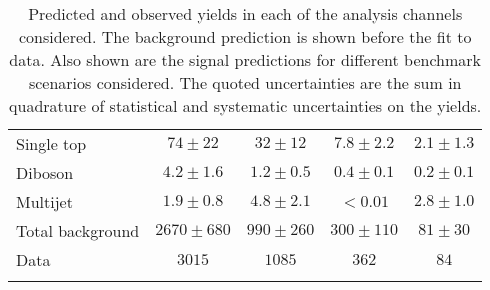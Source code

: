 \begin{table}
\begin{center}
{\begin{tabular}{l*{4}{c}}
Single top & $74 \pm 22$ & $32 \pm 12$ & $7.8 \pm 2.2$ & $2.1 \pm 1.3$\\
Diboson & $4.2 \pm 1.6$ & $1.2 \pm 0.5$ & $0.4 \pm 0.1$ & $0.2 \pm 0.1$\\
Multijet & $1.9 \pm 0.8$ & $4.8 \pm 2.1$ & $<0.01$ & $2.8 \pm 1.0$\\
\midrule
Total background & $2670 \pm 680$          & $990 \pm 260$          & $300 \pm 110$          & $81 \pm 30$         \\
\midrule
Data & $3015$ & $1085$ & $362$ & $84$\\
\bottomrule\bottomrule     \\
\end{tabular}
} %
\vspace{0.1cm}
\end{center}

%
\vspace{-0.5cm}
\caption{Predicted and observed yields in each of the analysis channels considered.
The background prediction is shown before the fit to data. Also shown are the signal predictions for different benchmark scenarios considered.
The quoted uncertainties are the sum in quadrature of statistical and systematic uncertainties on the yields.}
\label{tab:Prefit_Yields_HtX_unblind}
\end{table}
